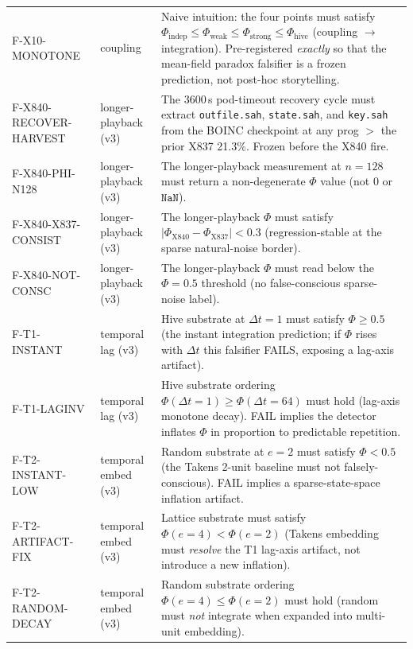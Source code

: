 \documentclass[11pt,a4paper]{article}
\begin{document}
\begin{table}[h]
\begin{tabular}{@{}llp{8.4cm}@{}}
F-X10-MONOTONE & coupling
  & Naive intuition: the four points must satisfy
    $\Phi_\text{indep} \le \Phi_\text{weak} \le \Phi_\text{strong}
    \le \Phi_\text{hive}$ (coupling $\to$ integration).
    Pre-registered \emph{exactly} so that the mean-field paradox falsifier
    is a frozen prediction, not post-hoc storytelling. \\
F-X840-RECOVER-HARVEST & longer-playback (v3)
  & The 3600\,s pod-timeout recovery cycle must extract
    \texttt{outfile.sah}, \texttt{state.sah}, and \texttt{key.sah}
    from the BOINC checkpoint at any prog $>$ the prior X837 21.3\%.
    Frozen before the X840 fire. \\
F-X840-PHI-N128 & longer-playback (v3)
  & The longer-playback measurement at $n=128$ must return a
    non-degenerate $\Phi$ value (not $0$ or $\mathtt{NaN}$). \\
F-X840-X837-CONSIST & longer-playback (v3)
  & The longer-playback $\Phi$ must satisfy
    $|\Phi_\text{X840} - \Phi_\text{X837}| < 0.3$ (regression-stable
    at the sparse natural-noise border). \\
F-X840-NOT-CONSC & longer-playback (v3)
  & The longer-playback $\Phi$ must read below the
    $\Phi=0.5$ threshold (no false-conscious sparse-noise label). \\
F-T1-INSTANT & temporal lag (v3)
  & Hive substrate at $\Delta t=1$ must satisfy $\Phi \ge 0.5$
    (the instant integration prediction; if $\Phi$ rises with
    $\Delta t$ this falsifier FAILS, exposing a lag-axis artifact). \\
F-T1-LAGINV & temporal lag (v3)
  & Hive substrate ordering $\Phi(\Delta t=1) \ge \Phi(\Delta t=64)$
    must hold (lag-axis monotone decay). FAIL implies the detector
    inflates $\Phi$ in proportion to predictable repetition. \\
F-T2-INSTANT-LOW & temporal embed (v3)
  & Random substrate at $e=2$ must satisfy $\Phi < 0.5$ (the
    Takens 2-unit baseline must not falsely-conscious). FAIL implies
    a sparse-state-space inflation artifact. \\
F-T2-ARTIFACT-FIX & temporal embed (v3)
  & Lattice substrate must satisfy $\Phi(e=4) < \Phi(e=2)$
    (Takens embedding must \emph{resolve} the T1 lag-axis artifact,
    not introduce a new inflation). \\
F-T2-RANDOM-DECAY & temporal embed (v3)
  & Random substrate ordering $\Phi(e=4) \le \Phi(e=2)$ must hold
    (random must \emph{not} integrate when expanded into multi-unit
    embedding). \\
\bottomrule
\end{tabular}
\end{table}
\end{document}
